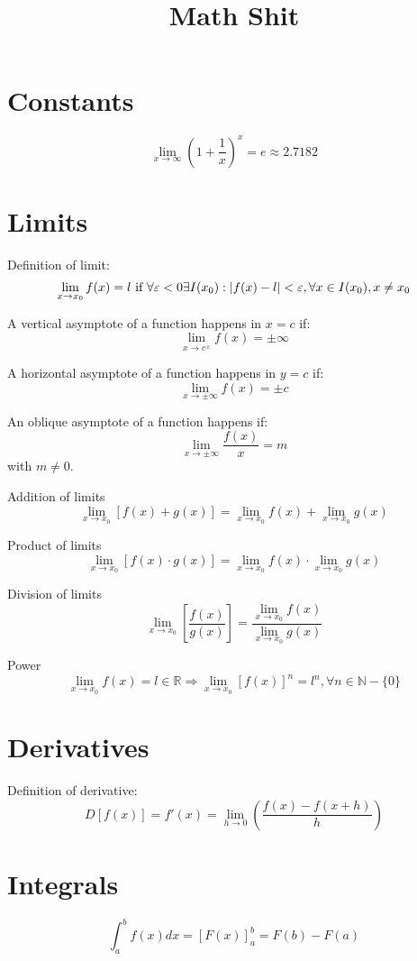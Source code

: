 \documentclass{article}
\begin{document}
\title{Math Shit}
\boldmath

\section{Constants}

\begin{equation}
\lim_{x\to\infty}(1+\frac{1}{x})^x=e\approx2.7182
\end{equation}

\section{Limits}

Definition of limit:
\begin{equation}
\lim_{x\to{x_0}}f(x) = l \textnormal{ if } \forall\varepsilon<0\exists I(x_0): |f(x) - l| < \varepsilon, \forall x \in I(x_0), x\neq x_0
\end{equation}

A vertical asymptote of a function happens in $x = c$ if:
\begin{equation}
\lim_{x\to{c^\pm}} f(x) = \pm\infty
\end{equation}

A horizontal asymptote of a function happens in $y = c$ if:
\begin{equation}
\lim_{x\to{\pm\infty}} f(x) = \pm c
\end{equation}

An oblique asymptote of a function happens if:
\begin{equation}
\lim_{x\to{\pm\infty}} \frac{f(x)}{x} = m
\end{equation}
with $m \neq 0$.

Addition of limits
\begin{equation}
\lim_{x\to{x_0}} [f(x) + g(x)] = \lim_{x\to{x_0}} f(x) + \lim_{x\to{x_0}} g(x)
\end{equation}

Product of limits
\begin{equation}
\lim_{x\to{x_0}} [f(x) \cdot g(x)] = \lim_{x\to{x_0}} f(x) \cdot \lim_{x\to{x_0}} g(x)
\end{equation}

Division of limits
\begin{equation}
\lim_{x\to{x_0}} [\frac{f(x)}{g(x)}] = \frac{\lim_{x\to{x_0}} f(x)}{\lim_{x\to{x_0}} g(x)}
\end{equation}

Power
\begin{equation}
\lim_{x\to{x_0}} f(x) = l \in \mathbb{R} \Rightarrow \lim_{x\to{x_0}} [f(x)]^n = l^n, \forall n\in \mathbb{N} - \{0\}
\end{equation}

\section{Derivatives}

Definition of derivative:
\begin{equation}
D[f(x)] = f'(x) = \lim_{h\to0}(\frac{f(x)-f(x+h)}{h})
\end{equation}

\section{Integrals}

\begin{equation}
\int_{a}^{b} f(x) dx = [F(x)]_{a}^{b} = F(b) - F(a)
\end{equation}
\end{document}
